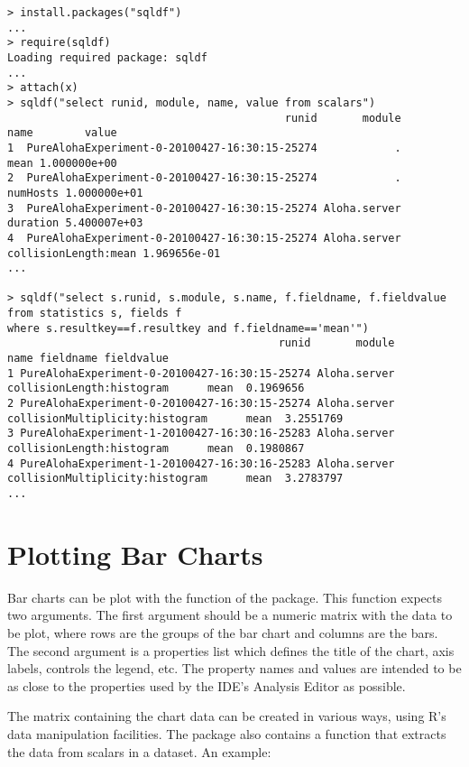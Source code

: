 \begin{verbatim}
> install.packages("sqldf")
...
> require(sqldf)
Loading required package: sqldf
...
> attach(x)
> sqldf("select runid, module, name, value from scalars")
                                           runid       module                    name        value
1  PureAlohaExperiment-0-20100427-16:30:15-25274            .                    mean 1.000000e+00
2  PureAlohaExperiment-0-20100427-16:30:15-25274            .                numHosts 1.000000e+01
3  PureAlohaExperiment-0-20100427-16:30:15-25274 Aloha.server                duration 5.400007e+03
4  PureAlohaExperiment-0-20100427-16:30:15-25274 Aloha.server    collisionLength:mean 1.969656e-01
...

> sqldf("select s.runid, s.module, s.name, f.fieldname, f.fieldvalue from statistics s, fields f
where s.resultkey==f.resultkey and f.fieldname=='mean'")
                                          runid       module                            name fieldname fieldvalue
1 PureAlohaExperiment-0-20100427-16:30:15-25274 Aloha.server       collisionLength:histogram      mean  0.1969656
2 PureAlohaExperiment-0-20100427-16:30:15-25274 Aloha.server collisionMultiplicity:histogram      mean  3.2551769
3 PureAlohaExperiment-1-20100427-16:30:16-25283 Aloha.server       collisionLength:histogram      mean  0.1980867
4 PureAlohaExperiment-1-20100427-16:30:16-25283 Aloha.server collisionMultiplicity:histogram      mean  3.2783797
...
\end{verbatim}


\section{Plotting Bar Charts}

Bar charts can be plot with the  function of the 
package. This function expects two arguments. The first argument should be 
a numeric matrix with the data to be plot, where rows are the groups of the 
bar chart and columns are the bars. The second argument is a properties list
which defines the title of the chart, axis labels, controls the legend, etc.
The property names and values are intended to be as close to the properties 
used by the IDE's Analysis Editor as possible.

The matrix containing the chart data can be created in various ways, using R's 
data manipulation facilities. The package also contains a 
function that extracts the data from scalars in a dataset. An example:

